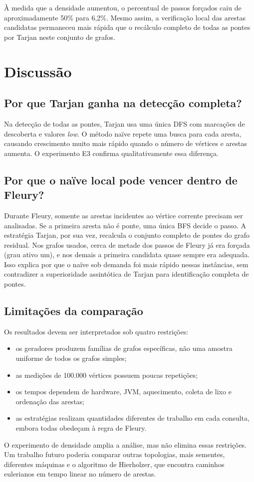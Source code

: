 \documentclass[12pt,a4paper]{article}
\newcommand{\naive}{na\"ive}
\begin{document}
À medida que a densidade aumentou, o percentual de passos forçados
caiu de aproximadamente 50\% para 6,2\%. Mesmo assim, a verificação
local das arestas candidatas permaneceu mais rápida que o recálculo
completo de todas as pontes por Tarjan neste conjunto de grafos.

\section{Discussão}
\subsection{Por que Tarjan ganha na detecção completa?}
Na detecção de todas as pontes, Tarjan usa uma única DFS com marcações
de descoberta e valores \emph{low}. O método \naive{} repete uma busca
para cada aresta, causando crescimento muito mais rápido quando o
número de vértices e arestas aumenta. O experimento E3 confirma
qualitativamente essa diferença.

\subsection{Por que o naïve local pode vencer dentro de Fleury?}
Durante Fleury, somente as arestas incidentes ao vértice corrente
precisam ser analisadas. Se a primeira aresta não é ponte, uma única
BFS decide o passo. A estratégia Tarjan, por sua vez, recalcula o
conjunto completo de pontes do grafo residual. Nos grafos usados,
cerca de metade dos passos de Fleury já era forçada (grau ativo um),
e nos demais a primeira candidata quase sempre era adequada.
Isso explica por que o \naive{} sob demanda foi mais rápido nessas
instâncias, sem contradizer a superioridade assintótica de Tarjan
para identificação completa de pontes.

\subsection{Limitações da comparação}
Os resultados devem ser interpretados sob quatro restrições:
\begin{itemize}
\item os geradores produzem famílias de grafos específicas, não uma amostra uniforme de todos os grafos simples;
\item as medições de 100.000 vértices possuem poucas repetições;
\item os tempos dependem de hardware, JVM, aquecimento, coleta de lixo e ordenação das arestas;
\item as estratégias realizam quantidades diferentes de trabalho em cada consulta, embora todas obedeçam à regra de Fleury.
\end{itemize}
O experimento de densidade amplia a análise, mas não elimina essas
restrições. Um trabalho futuro poderia comparar outras topologias,
mais sementes, diferentes máquinas e o algoritmo de Hierholzer,
que encontra caminhos eulerianos em tempo linear no número de arestas.
\end{document}
